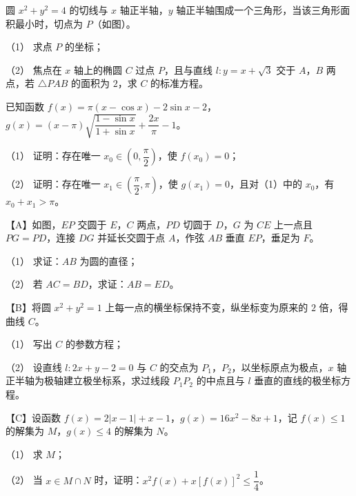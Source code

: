 \begin{question}
圆 $x^2+y^2=4$ 的切线与 $x$ 轴正半轴，$y$ 轴正半轴围成一个三角形，当该三角形面积最小时，切点为 $P$（如图）。
\nopagebreak[4]
\begin{center}\end{center}
\nopagebreak[4]
（1） 求点 $P$ 的坐标；

（2） 焦点在 $x$ 轴上的椭圆 $C$ 过点 $P$，且与直线 $l:y=x+\sqrt3$ 交于 $A$，$B$ 两点，若 $\triangle PAB$ 的面积为 $2$，求 $C$ 的标准方程。

\end{question}
\begin{question}
已知函数 $f(x)=\pi(x-\cos x)-2\sin x-2$，$g(x)=(x-\pi)\sqrt{\dfrac{1-\sin x}{1+\sin x}}+\dfrac{2x}{\pi}-1$。

（1） 证明：存在唯一 $x_0\in\left(0,\dfrac\pi2\right)$，使 $f(x_0)=0$；

（2） 证明：存在唯一 $x_1\in\left(\dfrac\pi2,\pi\right)$，使 $g(x_1)=0$，且对（1）中的 $x_0$，有 $x_0+x_1>\pi$。

\end{question}

\Needspace{0.4\textheight}
\begin{question}
【A】如图，$EP$ 交圆于 $E$，$C$ 两点，$PD$ 切圆于 $D$，$G$ 为 $CE$ 上一点且 $PG=PD$，连接 $DG$ 并延长交圆于点 $A$，作弦 $AB$ 垂直 $EP$，垂足为 $F$。
\nopagebreak[4]
\begin{center}\end{center}
\nopagebreak[4]
（1） 求证：$AB$ 为圆的直径；

（2） 若 $AC=BD$，求证：$AB=ED$。

\end{question}
\begin{question}
【B】将圆 $x^2+y^2=1$ 上每一点的横坐标保持不变，纵坐标变为原来的 $2$ 倍，得曲线 $C$。

（1） 写出 $C$ 的参数方程；

（2） 设直线 $l:2x+y-2=0$ 与 $C$ 的交点为 $P_1$，$P_2$，以坐标原点为极点，$x$ 轴正半轴为极轴建立极坐标系，求过线段 $P_1P_2$ 的中点且与 $l$ 垂直的直线的极坐标方程。

\end{question}
\begin{question}
【C】设函数 $f(x)=2|x-1|+x-1$，$g(x)=16x^2-8x+1$，记 $f(x)\leqslant 1$ 的解集为 $M$，$g(x)\leqslant 4$ 的解集为 $N$。

（1） 求 $M$；

（2） 当 $x\in M\cap N$ 时，证明：$x^2f(x)+x[f(x)]^2\leqslant\dfrac14$。

\end{question}